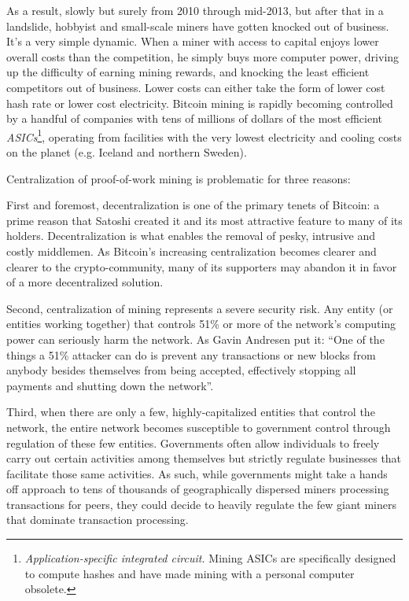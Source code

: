 \documentclass[a4paper,11pt]{article}
\begin{document}
As a result, slowly but surely from 2010 through mid-2013, but after that in a landslide, hobbyist and small-scale miners have gotten knocked out of business. It's a very simple dynamic. When a miner with access to capital enjoys lower overall costs than the competition, he simply buys more computer power, driving up the difficulty of earning mining rewards, and knocking the least efficient competitors out of business. Lower costs can either take the form of lower cost hash rate or lower cost electricity. Bitcoin mining is rapidly becoming controlled by a handful of companies with tens of millions of dollars of the most efficient \textit{ASICs}\footnote{\textit{Application-specific integrated circuit.} Mining ASICs are specifically designed to compute hashes and have made mining with a personal computer obsolete.}, operating from facilities with the very lowest electricity and cooling costs on the planet (e.g. Iceland and northern Sweden). 

Centralization of proof-of-work mining is problematic for three reasons: 

First and foremost, decentralization is one of the primary tenets of Bitcoin: a prime reason that Satoshi created it and its most attractive feature to many of its holders. Decentralization is what enables the removal of pesky, intrusive and costly middlemen. As Bitcoin's increasing centralization becomes clearer and clearer to the crypto-community, many of its supporters may abandon it in favor of a more decentralized solution.

Second, centralization of mining represents a severe security risk. Any entity (or entities working together) that controls 51\% or more of the network's computing power can seriously harm the network. As Gavin Andresen put it: ``One of the things a 51\% attacker can do is prevent any transactions or new blocks from anybody besides themselves from being accepted, effectively stopping all payments and shutting down the network''\cite{gavin51}.

Third, when there are only a few, highly-capitalized entities that control the network, the entire network becomes susceptible to government control through regulation of these few entities. 
Governments often allow individuals to freely carry out certain activities among themselves but strictly regulate businesses that facilitate those same activities. As such, while governments might take a hands off approach to tens of thousands of geographically dispersed miners processing transactions for peers, they could decide to heavily regulate the few giant miners that dominate transaction processing.  
\end{document}
